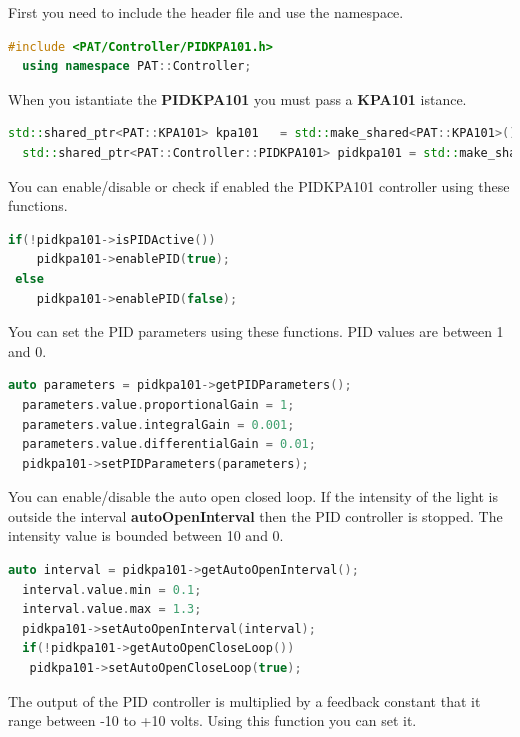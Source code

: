First you need to include the header file and use the namespace.

\begin{lstlisting}[language=c++, gobble=2]
  #include <PAT/Controller/PIDKPA101.h>
  using namespace PAT::Controller;
\end{lstlisting}

When you istantiate the \textbf{PIDKPA101} you must pass a
\textbf{KPA101} istance.

\begin{lstlisting}[language=c++, gobble=2]
  std::shared_ptr<PAT::KPA101> kpa101   = std::make_shared<PAT::KPA101>();
  std::shared_ptr<PAT::Controller::PIDKPA101> pidkpa101 = std::make_shared<PAT::Controller::PIDKPA101>(kpa101);
\end{lstlisting}


You can enable/disable or check if enabled the PIDKPA101 controller
using these functions.

\begin{lstlisting}[language=c++, gobble=2]
  if(!pidkpa101->isPIDActive())
    pidkpa101->enablePID(true);
 else
    pidkpa101->enablePID(false); 
\end{lstlisting}


You can set the PID parameters using these functions. PID values are
between 1 and 0.

\begin{lstlisting}[language=c++, gobble=2]
  auto parameters = pidkpa101->getPIDParameters();
  parameters.value.proportionalGain = 1;
  parameters.value.integralGain = 0.001;
  parameters.value.differentialGain = 0.01;
  pidkpa101->setPIDParameters(parameters);
\end{lstlisting}


You can enable/disable the auto open closed loop. If the intensity of
the light is outside the interval \textbf{autoOpenInterval} then the PID
controller is stopped. The intensity value is bounded between 10 and 0.

\begin{lstlisting}[language=c++, gobble=2]
  auto interval = pidkpa101->getAutoOpenInterval();
  interval.value.min = 0.1;
  interval.value.max = 1.3;
  pidkpa101->setAutoOpenInterval(interval);
  if(!pidkpa101->getAutoOpenCloseLoop())
   pidkpa101->setAutoOpenCloseLoop(true);
\end{lstlisting}

The output of the PID controller is multiplied by a feedback constant
that it range between -10 to +10 volts. Using this function you can set
it.

